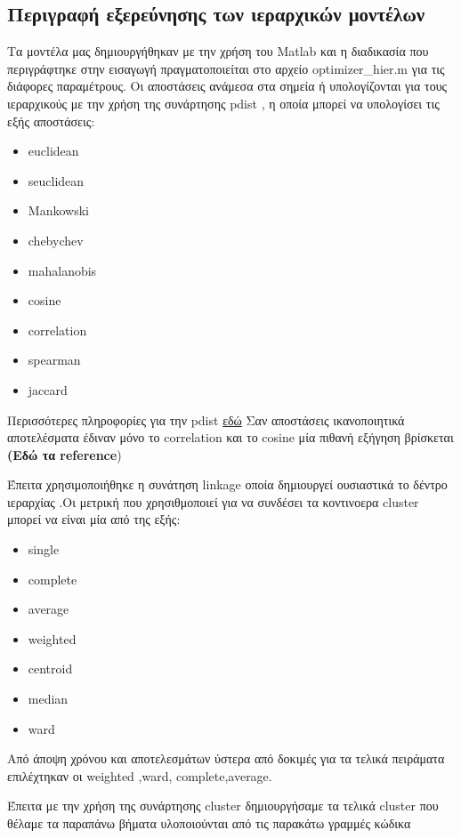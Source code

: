 \subsection{Περιγραφή εξερεύνησης των ιεραρχικών μοντέλων}

Τα μοντέλα μας δημιουργήθηκαν με την χρήση του Matlab και η διαδικασία που περιγράφτηκε στην εισαγωγή πραγματοποιείται στο αρχείο optimizer\_hier.m
για τις διάφορες παραμέτρους. Οι αποστάσεις ανάμεσα στα σημεία ή υπολογίζονται για τους ιεραρχικούς με την χρήση της συνάρτησης pdist , η οποία μπορεί να υπολογίσει τις εξής αποστάσεις:
\begin{itemize}
    \item euclidean
    \item seuclidean
    \item Mankowski
    \item chebychev
    \item mahalanobis
    \item cosine
    \item correlation
    \item spearman
    \item jaccard 
\end{itemize}


Περισσότερες πληροφορίες για την pdist \href{http://www.mathworks.com/help/stats/pdist.html}{εδώ}
Σαν αποστάσεις ικανοποιητικά αποτελέσματα έδιναν μόνο το correlation και το 
cosine  μία πιθανή εξήγηση βρίσκεται \textbf{(Εδώ τα reference})

Έπειτα χρησιμοποιήθηκε η συνάτηση linkage οποία δημιουργεί ουσιαστικά το δέντρο ιεραρχίας .Οι μετρική που χρησιθμοποιεί για να συνδέσει τα κοντινοερα cluster μπορεί να είναι μία από της εξής:
\begin{itemize}
    \item single
    \item complete
    \item average
    \item weighted
    \item centroid
    \item median
    \item ward 
  \end{itemize}

Από άποψη χρόνου και αποτελεσμάτων ύστερα από δοκιμές για τα τελικά πειράματα επιλέχτηκαν οι weighted ,ward, complete,average.

Έπειτα με την χρήση της συνάρτησης cluster δημιουργήσαμε τα τελικά cluster που θέλαμε τα παραπάνω βήματα υλοποιούνται από τις παρακάτω γραμμές κώδικα 


